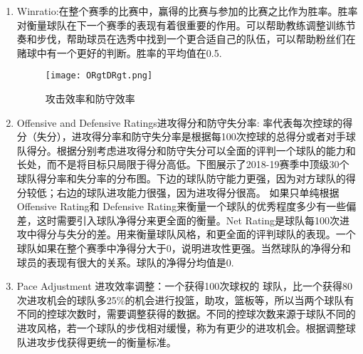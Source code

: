 \begin{enumerate}
\begin{enumerate}
	
		\item Winratio:在整个赛季的比赛中，赢得的比赛与参加的比赛之比作为胜率。胜率对衡量球队在下一个赛季的表现有着很重要的作用。可以帮助教练调整训练节奏和步伐，帮助球员在选秀中找到一个更合适自己的队伍，可以帮助粉丝们在赌球中有一个更好的判断。胜率的平均值在0.5.
				\begin{figure}[h]
			\texttt{[image: ORgtDRgt.png]}\label{fig:1}
			\centering
			\caption{攻击效率和防守效率}
		\end{figure}
		\item Offensive and Defensive Ratings进攻得分和防守失分率: 率代表每次控球的得分（失分），进攻得分率和防守失分率是根据每100次控球的总得分或者对手球队得分。根据分别考虑进攻得分和防守失分可以全面的评判一个球队的能力和长处，而不是将目标只局限于得分高低。下图展示了2018-19赛季中顶级30个球队得分率和失分率的分布图。下边的球队防守能力更强，因为对方球队的得分较低；右边的球队进攻能力很强，因为进攻得分很高。 如果只单纯根据Offensive Rating和 Defensive Rating来衡量一个球队的优秀程度多少有一些偏差，这时需要引入球队净得分来更全面的衡量。Net Rating是球队每100次进攻中得分与失分的差。用来衡量球队风格，和更全面的评判球队的表现。一个球队如果在整个赛季中净得分大于0，说明进攻性更强。当然球队的净得分和球员的表现有很大的关系。球队的净得分均值是0. 
	
		\item Pace Adjustment 进攻效率调整：一个获得100次球权的 球队，比一个获得80次进攻机会的球队多25\%的机会进行投篮，助攻，篮板等，所以当两个球队有不同的控球次数时，需要调整获得的数据。不同的控球次数来源于球队不同的进攻风格，若一个球队的步伐相对缓慢，称为有更少的进攻机会。根据调整球队进攻步伐获得更统一的衡量标准。
		
		\end{enumerate}
		
	\end{enumerate}


